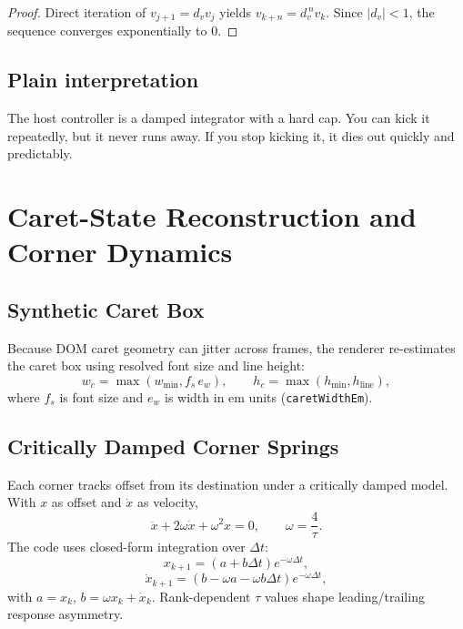 \documentclass[journal]{IEEEtran}
\begin{document}
\begin{proof}
Direct iteration of \(v_{j+1}=d_v v_j\) yields \(v_{k+n}=d_v^{\,n}v_k\). Since \(|d_v|<1\), the sequence converges exponentially to \(0\).
\end{proof}

\subsection{Plain interpretation}
The host controller is a damped integrator with a hard cap. You can kick it repeatedly, but it never runs away. If you stop kicking it, it dies out quickly and predictably.

\section{Caret-State Reconstruction and Corner Dynamics}

\subsection{Synthetic Caret Box}
Because DOM caret geometry can jitter across frames, the renderer re-estimates the caret box using resolved font size and line height:
\begin{equation}
w_c=\max(w_{\min}, f_s \, e_w), \qquad
h_c=\max(h_{\min}, h_{\text{line}}),
\end{equation}
where \(f_s\) is font size and \(e_w\) is width in em units (\texttt{caretWidthEm}).

\subsection{Critically Damped Corner Springs}
Each corner tracks offset from its destination under a critically damped model. With \(x\) as offset and \(\dot{x}\) as velocity,
\begin{equation}
\ddot{x}+2\omega\dot{x}+\omega^2x=0,\qquad \omega=\frac{4}{\tau}.
\end{equation}
The code uses closed-form integration over \(\Delta t\):
\begin{equation}
x_{k+1}=(a+b\Delta t)e^{-\omega\Delta t},
\end{equation}
\begin{equation}
\dot{x}_{k+1}=\left(b-\omega a-\omega b\Delta t\right)e^{-\omega\Delta t},
\end{equation}
with \(a=x_k\), \(b=\omega x_k+\dot{x}_k\). Rank-dependent \(\tau\) values shape leading/trailing response asymmetry.
\end{document}
